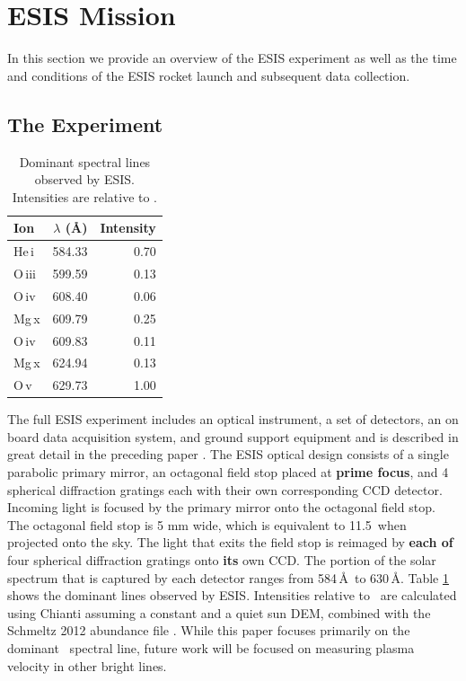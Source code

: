 \documentclass[linenumbers,trackchanges]{aastex63}
\begin{document}
\section{ESIS Mission}

In this section we provide an overview of the ESIS experiment as well as the time and conditions of the ESIS rocket launch and subsequent data collection.   

	\subsection{The Experiment}
	
	\begin{table}
		\begin{center}
			\caption{Dominant spectral lines observed by ESIS.  Intensities are relative to \ov.}
			\label{tab:linelist}
			\begin{tabular}{l|r|r}
				
				\hline
				Ion & $\lambda$ (\AA) & Intensity \\
				\hline
He\,{\sc i} & 584.33 & 0.70 \\
				O\,{\sc iii} & 599.59 & 0.13 \\
				O\,{\sc iv} & 608.40 & 0.06 \\
				Mg\,{\sc x} & 609.79 & 0.25 \\
				O\,{\sc iv} & 609.83 & 0.11 \\
				Mg\,{\sc x} & 624.94 & 0.13 \\
				O\,{\sc v} & 629.73 & 1.00 \\

				\hline
			\end{tabular}
		\end{center}
	\end{table}
		
	  	
    	The full ESIS experiment includes an optical instrument, a set of detectors, an on board data acquisition system, and ground support equipment and is described in great detail in the preceding paper \citep{ESIS}.
    	The ESIS optical design consists of a single parabolic primary mirror, an octagonal field stop placed at \textbf{prime focus}, and 4 spherical diffraction gratings each with their own corresponding CCD detector.
    	Incoming light is focused by the primary mirror onto the octagonal field stop. 
    	The octagonal field stop is  5 mm wide, which is equivalent to 11.5\arcmin \  when projected onto the sky. 
    	The light that exits the field stop is reimaged  by \textbf{each of} four spherical diffraction gratings onto \textbf{its} own CCD.
    	The portion of the solar spectrum that is captured by each detector ranges from  584\,\AA \ to 630\,\AA. 
    	Table \ref{tab:linelist} shows the dominant lines observed by ESIS.
    	Intensities relative to \ov \ are calculated using Chianti \citep{ChiantiI,ChiantiX} assuming a constant and a quiet sun DEM, combined with the Schmeltz 2012 abundance file \citep{schmelz2012}.
  		While this paper focuses primarily on the dominant \ov \ spectral line, future work will be focused on measuring plasma velocity in other bright lines.
   			
\end{document}
